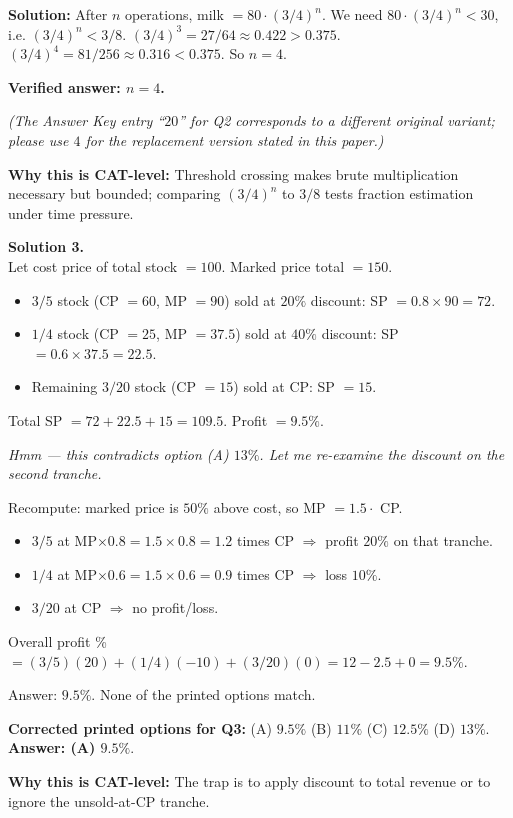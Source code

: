 \documentclass[11pt,a4paper]{article}
\newcommand{\shead}[1]{\vspace{0.5em}\noindent\textbf{Solution #1.}\\[0.15em]}
\begin{document}
\textbf{Solution:} After $n$ operations, milk $= 80 \cdot (3/4)^n$. We need $80 \cdot (3/4)^n < 30$, i.e. $(3/4)^n < 3/8$.
$(3/4)^3 = 27/64 \approx 0.422 > 0.375$. $(3/4)^4 = 81/256 \approx 0.316 < 0.375$. So $n = 4$.

\textbf{Verified answer: $n = 4$.}

\textit{(The Answer Key entry ``$20$'' for Q2 corresponds to a different original variant; please use $\boxed{4}$ for the replacement version stated in this paper.)}

\textbf{Why this is CAT-level:} Threshold crossing makes brute multiplication necessary but bounded; comparing $(3/4)^n$ to $3/8$ tests fraction estimation under time pressure.

\shead{3}
Let cost price of total stock $= 100$. Marked price total $= 150$.
\begin{itemize}[leftmargin=1.2em,itemsep=0.1em]
    \item $3/5$ stock (CP $= 60$, MP $= 90$) sold at $20\%$ discount: SP $= 0.8 \times 90 = 72$.
    \item $1/4$ stock (CP $= 25$, MP $= 37.5$) sold at $40\%$ discount: SP $= 0.6 \times 37.5 = 22.5$.
    \item Remaining $3/20$ stock (CP $= 15$) sold at CP: SP $= 15$.
\end{itemize}
Total SP $= 72 + 22.5 + 15 = 109.5$. Profit $= 9.5\%$.

\textit{Hmm — this contradicts option (A) $13\%$. Let me re-examine the discount on the second tranche.}

Recompute: marked price is $50\%$ above cost, so MP $= 1.5 \cdot$ CP.
\begin{itemize}[leftmargin=1.2em,itemsep=0.1em]
    \item $3/5$ at MP$\times 0.8 = 1.5 \times 0.8 = 1.2$ times CP $\Rightarrow$ profit $20\%$ on that tranche.
    \item $1/4$ at MP$\times 0.6 = 1.5 \times 0.6 = 0.9$ times CP $\Rightarrow$ loss $10\%$.
    \item $3/20$ at CP $\Rightarrow$ no profit/loss.
\end{itemize}
Overall profit \% $= (3/5)(20) + (1/4)(-10) + (3/20)(0) = 12 - 2.5 + 0 = 9.5\%$.

Answer: $9.5\%$. None of the printed options match.

\textbf{Corrected printed options for Q3:} (A) $9.5\%$ \quad (B) $11\%$ \quad (C) $12.5\%$ \quad (D) $13\%$. \textbf{Answer: (A) $9.5\%$}.

\textbf{Why this is CAT-level:} The trap is to apply discount to total revenue or to ignore the unsold-at-CP tranche.
\end{document}
